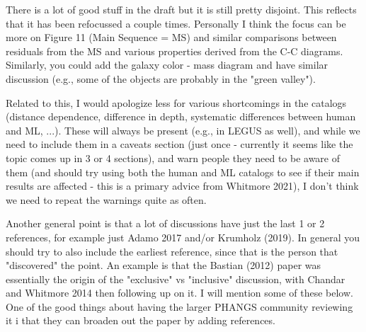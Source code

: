 There is a lot of good stuff in the draft but it is still pretty disjoint. This reflects that it has been refocussed a couple times. Personally I think the focus can be more on Figure 11 (Main Sequence = MS) and similar comparisons between residuals from the MS and various properties derived from the C-C diagrams. Similarly, you could add the galaxy color - mass diagram and have similar discussion (e.g., some of the objects are probably in the "green valley").

 

Related to this, I would apologize less for various shortcomings in the catalogs (distance dependence, difference in depth, systematic differences between human and ML, ...). These will always be present (e.g., in LEGUS as well), and while we need to include them in a caveats section (just once - currently it seems like the topic comes up in 3 or 4 sections), and  warn people they need to be aware of them (and should try using both the human and ML catalogs to see if their main results are affected - this is a primary advice from Whitmore 2021), I don't think we need to repeat the warnings quite as often.

 

Another general point is that a lot of discussions have just the last 1 or 2 references, for example just Adamo 2017 and/or Krumholz (2019). In general you should try to also include the earliest reference, since that is the person that "discovered" the point. An example is that the Bastian (2012) paper was essentially the origin of the "exclusive" vs "inclusive" discussion, with Chandar and Whitmore 2014 then following up on it. I will mention some of these below. One of the good things about having the larger PHANGS community reviewing it i that they can broaden out the paper by adding  references.

 

 




 



 

